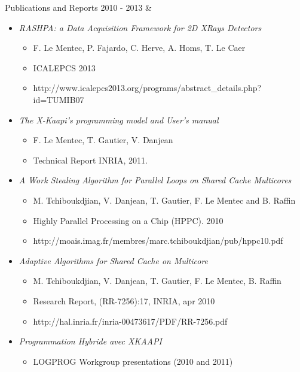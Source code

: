 \documentclass{resume}
\newcommand{\activite}[1]{\textbf{#1}\ }
\begin{document}
\newpage
\begin{rubriquetableau}[3cm]{Publications and Reports}
  \small{2010 - 2013}
  & \activite{}
  \begin{small}
    \begin{itemize}
    \item \textit{RASHPA: a Data Acquisition Framework for 2D XRays Detectors}
      \begin{itemize}
      \item F. Le Mentec, P. Fajardo, C. Herve, A. Homs, T. Le Caer
      \item ICALEPCS 2013
      \item http://www.icalepcs2013.org/programs/abstract\_details.php?id=TUMIB07
      \end{itemize}

    \item \textit{The X-Kaapi's programming model and User's manual}
      \begin{itemize}
      \item F. Le Mentec, T. Gautier, V. Danjean
      \item Technical Report INRIA, 2011.
      \end{itemize}

    \item \textit{A Work Stealing Algorithm for Parallel Loops on Shared Cache Multicores}
      \begin{itemize}
      \item M. Tchiboukdjian, V. Danjean, T. Gautier, F. Le Mentec and B. Raffin
      \item Highly Parallel Processing on a Chip (HPPC). 2010
      \item http://moais.imag.fr/membres/marc.tchiboukdjian/pub/hppc10.pdf
      \end{itemize}

    \item \textit{Adaptive Algorithms for Shared Cache on Multicore}
      \begin{itemize}
      \item M. Tchiboukdjian, V. Danjean, T. Gautier, F. Le Mentec, B. Raffin
      \item Research Report, ({RR}-7256):17, INRIA, apr 2010
      \item http://hal.inria.fr/inria-00473617/PDF/RR-7256.pdf
      \end{itemize}

    \item \textit{Programmation Hybride avec XKAAPI}
      \begin{itemize}
      \item LOGPROG Workgroup presentations (2010 and 2011)
      \end{itemize}

    \end{itemize}
  \end{small}
\end{rubriquetableau}
\end{document}
